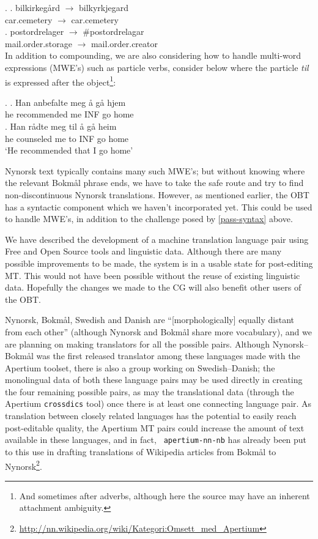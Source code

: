 \documentclass[11pt]{article}
\newcommand{\comment}[1]{\textbf{SKRIV} {\it #1}}
\renewcommand{\comment}[1]{}
\begin{document}
\ex. \ag. bilkirkegård $\rightarrow$ bilkyrkjegard\\
car.cemetery $\rightarrow$ car.cemetery\\
\bg. postordrelager $\rightarrow$ \#postordrelagar\\
mail.order.storage $\rightarrow$ mail.order.creator\\

In addition to compounding, we are also considering how to handle
multi-word expressions (MWE's) such as particle verbs, consider \Next below
where the particle \emph{til} is expressed after the
object\footnote{And sometimes after adverbs, although here the source
  may have an inherent attachment ambiguity.}:

\ex. \ag. Han anbefalte meg å gå hjem\\
he recommended me INF go home\\
\bg. Han rådte meg til å gå heim\\
he counseled me to INF go home\\
`He recommended that I go home'

Nynorsk text typically contains many such MWE's; but without knowing
where the relevant Bokmål phrase ends, we have to take the safe route
and try to find non-discontinuous Nynorsk translations. However, as
mentioned earlier, the OBT has a syntactic component which we haven't
incorporated yet. This could be used to handle MWE's, in addition to
the challenge posed by \ref{pass-syntax} above.

\comment{ noko om at nn-nb.po kan nyttast som TMX med Apertium?}

We have described the development of a machine translation language
pair using Free and Open Source tools and linguistic data. Although
there are many possible improvements to be made, the system is in a
usable state for post-editing MT. This would not have been possible
without the reuse of existing linguistic data. Hopefully the changes
we made to the CG will also benefit other users of the OBT.

Nynorsk, Bokmål, Swedish and Danish are ``[morphologically] equally
distant from each other'' \citep[p.~1]{everson2000sln} (although
Nynorsk and Bokmål share more vocabulary), and we are planning on
making translators for all the possible pairs.  Although
Nynorsk–Bokmål was the first released translator among these languages
made with the Apertium toolset, there is also a group working on
Swedish–Danish; the monolingual data of both these language pairs may
be used directly in creating the four remaining possible pairs, as may
the translational data (through the Apertium {\tt crossdics} tool)
once there is at least one connecting language pair. As translation
between closely related languages has the potential to easily reach
post-editable quality, the Apertium MT pairs could increase the amount
of text available in these languages, and in fact, {\tt
  apertium-nn-nb} has already been put to this use in drafting
translations of Wikipedia articles from Bokmål to
Nynorsk\footnote{\href{http://nn.wikipedia.org/wiki/Kategori:Omsett_med_Apertium}{http://nn.wikipedia.org/wiki/Kategori:Omsett\_med\_Apertium}}.
\end{document}
